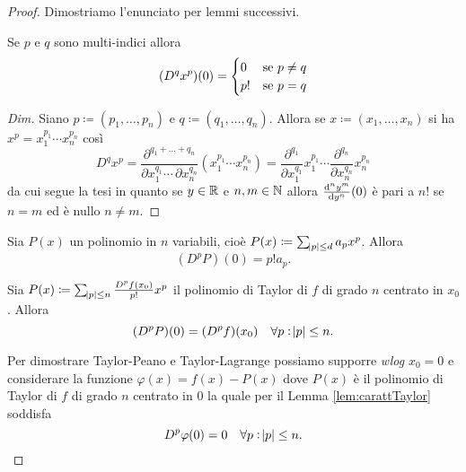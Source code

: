 \begin{proof}
	Dimostriamo l'enunciato per lemmi successivi.
	\begin{lemma}
		Se $ p $ e $ q $ sono multi-indici allora 
		\begin{equation}
			(D^q x^p)(0) = 
			\begin{cases}
				0 & \text{se $ p \neq q $} \\
				p! & \text{se $ p = q $}
			\end{cases}
		\end{equation}
	\end{lemma}
	\begin{proof}[Dim]
		Siano $ p \coloneqq (p_1, \ldots, p_n) $ e $ q \coloneqq (q_1, \ldots, q_n) $. Allora se $ x \coloneqq (x_1, \ldots, x_n) $ si ha $ x^p = x_1^{p_1} \cdots x_n^{p_n} $ così
		\[
			D^q x^p = \dfrac{\partial^{q_1 + \ldots + q_n}}{\partial{x_1^{q_1}} \cdots \, \partial{x_n^{q_n}}} (x_1^{p_1} \cdots x_n^{p_n}) = \frac{\partial^{q_1}}{\partial x_1^{q_1}} x_1^{p_1} \cdots \frac{\partial^{q_n}}{\partial x_n^{q_n}} x_n^{p_n}
		\]
		da cui segue la tesi in quanto se $ y \in \mathbb{R} $ e $ n, m \in \mathbb{N} $ allora $ \od[n]{y^m}{y}(0) $ è pari a $ n! $ se $ n = m $ ed è nullo $ n \neq m $.
	\end{proof}

	\begin{lemma}
		Sia $ P(x) $ un polinomio in $ n $ variabili, cioè $ P(x) \coloneqq \sum_{\abs{p} \leq d} a_p x^p $. Allora 
		\begin{equation}
			(D^pP)(0) = p! a_p.
		\end{equation}
	\end{lemma}

	\begin{lemma} \label{lem:carattTaylor}
		Sia $ P(x) \coloneqq \sum_{\abs{p} \leq n} \frac{D^pf(x_0)}{p!} x^p $ il polinomio di Taylor di $ f $ di grado $ n $ centrato in $ x_0 $. Allora
		\begin{equation}
			(D^pP)(0) = (D^pf)(x_0) \quad \forall p : \abs{p} \leq n.
		\end{equation}
	\end{lemma}

	Per dimostrare Taylor-Peano e Taylor-Lagrange possiamo supporre \emph{wlog} $ x_0 = 0 $ e considerare la funzione $ \varphi(x) = f(x) - P(x) $ dove $ P(x) $ è il polinomio di Taylor di $ f $ di grado $ n $ centrato in $ 0 $ la quale per il Lemma \ref{lem:carattTaylor} soddisfa
	\begin{equation} \label{eqn:carattTaylor}
		D^p \varphi(0) = 0 \quad \forall p : \abs{p} \leq n.
	\end{equation} 


\end{proof}
